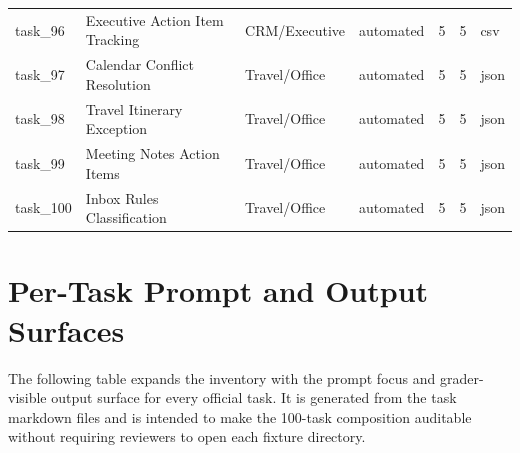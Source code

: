 \documentclass[11pt]{article}
\begin{document}
\begin{longtable}{L{0.09\textwidth}L{0.30\textwidth}L{0.25\textwidth}L{0.10\textwidth}L{0.07\textwidth}L{0.07\textwidth}L{0.08\textwidth}}
task\_96 & Executive Action Item Tracking & CRM/Executive & automated & 5 & 5 & csv \\
task\_97 & Calendar Conflict Resolution & Travel/Office & automated & 5 & 5 & json \\
task\_98 & Travel Itinerary Exception & Travel/Office & automated & 5 & 5 & json \\
task\_99 & Meeting Notes Action Items & Travel/Office & automated & 5 & 5 & json \\
task\_100 & Inbox Rules Classification & Travel/Office & automated & 5 & 5 & json \\
\bottomrule
\end{longtable}
\endgroup

\section{Per-Task Prompt and Output Surfaces}
\label{app:task-output-surfaces}
The following table expands the inventory with the prompt focus and grader-visible output surface for every official task. It is generated from the task markdown files and is intended to make the 100-task composition auditable without requiring reviewers to open each fixture directory.
\begingroup
\scriptsize
\setlength{\tabcolsep}{1.5pt}
\end{document}
